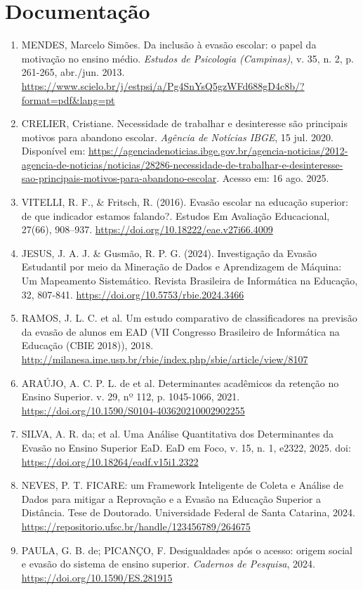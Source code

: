 \documentclass[english, spanish, brazilian]{RBIEarticle} %
\begin{document}
\section*{Documentação}
\begin{enumerate}
    \item MENDES, Marcelo Simões. Da inclusão à evasão escolar: o papel da motivação no ensino médio. \textit{Estudos de Psicologia (Campinas)}, v. 35, n. 2, p.  261-265, abr./jun. 2013. \url{https://www.scielo.br/j/estpsi/a/Pg4SnYsQ5gzWFd688gD4c8b/?format=pdf&lang=pt}
    \item CRELIER, Cristiane. Necessidade de trabalhar e desinteresse são principais motivos para abandono escolar. \textit{Agência de Notícias IBGE}, 15 jul. 2020. Disponível em: \url{https://agenciadenoticias.ibge.gov.br/agencia-noticias/2012-agencia-de-noticias/noticias/28286-necessidade-de-trabalhar-e-desinteresse-sao-principais-motivos-para-abandono-escolar}. Acesso em: 16 ago. 2025.
    \item VITELLI, R. F., \& Fritsch, R. (2016). Evasão escolar na educação superior: de que indicador estamos falando?. Estudos Em Avaliação Educacional, 27(66), 908–937. \url{https://doi.org/10.18222/eae.v27i66.4009}
    \item JESUS, J. A. J. \& Gusmão, R. P. G. (2024). Investigação da Evasão Estudantil por meio da Mineração de Dados e Aprendizagem de Máquina: Um Mapeamento Sistemático. Revista Brasileira de Informática na Educação, 32, 807-841. \url{https://doi.org/10.5753/rbie.2024.3466}
    \item RAMOS, J. L. C. et al. Um estudo comparativo de classificadores na previsão da evasão
    de alunos em EAD (VII Congresso Brasileiro de Informática na Educação (CBIE 2018)), 2018. \url{http://milanesa.ime.usp.br/rbie/index.php/sbie/article/view/8107}
    \item ARAÚJO, A. C. P. L. de et al. Determinantes acadêmicos da retenção no Ensino Superior. v. 29, nº 112, p. 1045-1066, 2021. \url{https://doi.org/10.1590/S0104-403620210002902255}
    \item SILVA, A. R. da; et al. Uma Análise Quantitativa dos Determinantes da Evasão no Ensino Superior EaD. EaD em Foco, v. 15, n. 1, e2322, 2025. doi: \url{https://doi.org/10.18264/eadf.v15i1.2322}
    \item NEVES, P. T. FICARE: um Framework Inteligente de Coleta e Análise de Dados para mitigar a Reprovação e a Evasão na Educação Superior a Distância. Tese de Doutorado. Universidade Federal de Santa Catarina, 2024. \url{https://repositorio.ufsc.br/handle/123456789/264675}
    \item PAULA, G. B. de; PICANÇO, F. Desigualdades após o acesso: origem social e evasão do sistema de ensino superior. \textit{Cadernos de Pesquisa}, 2024. \url{https://doi.org/10.1590/ES.281915}
    
\end{enumerate}
\end{document}
